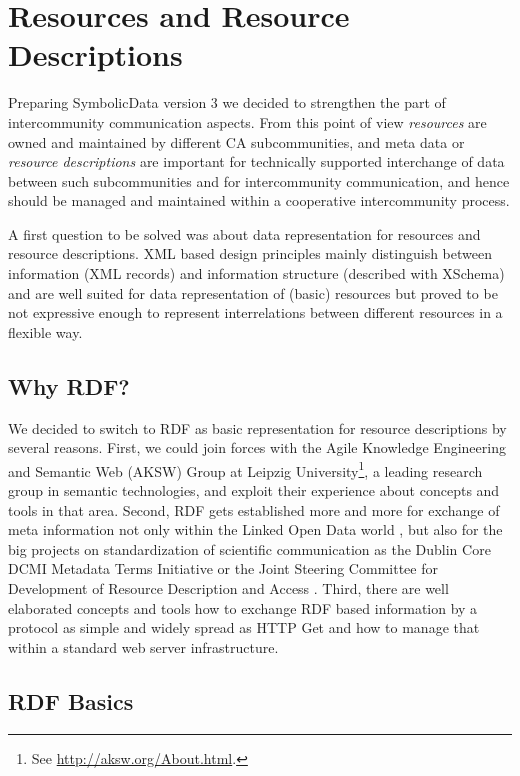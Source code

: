 \documentclass{llncs}
\newcommand{\SD}{{\sc Symbolic\-Data}}
\begin{document}
\section{Resources and Resource Descriptions}

Preparing {\SD} version 3 we decided to strengthen the part of intercommunity
communication aspects.  From this point of view \emph{resources} are owned and
maintained by different CA subcommunities, and meta data or \emph{resource
  descriptions} are important for technically supported interchange of data
between such subcommunities and for intercommunity communication, and hence
should be managed and maintained within a cooperative intercommunity process.

A first question to be solved was about data representation for resources and
resource descriptions.  XML based design principles mainly distinguish between
information (XML records) and information structure (described with XSchema)
and are well suited for data representation of (basic) resources but proved to
be not expressive enough to represent interrelations between different
resources in a flexible way.

\subsection{Why RDF?}

We decided to switch to RDF as basic representation for resource descriptions
by several reasons. First, we could join forces with the Agile Knowledge
Engineering and Semantic Web (AKSW) Group at Leipzig University\footnote{See
  \url{http://aksw.org/About.html}.}, a leading research group in semantic
technologies, and exploit their experience about concepts and tools in that
area. Second, RDF gets established more and more for exchange of meta
information not only within the Linked Open Data world \cite{lod}, but also
for the big projects on standardization of scientific communication as the
Dublin Core DCMI Metadata Terms Initiative \cite{dcterms} or the Joint
Steering Committee for Development of Resource Description and Access
\cite{RDA}.  Third, there are well elaborated concepts and tools how to
exchange RDF based information by a protocol as simple and widely spread as
HTTP Get and how to manage that within a standard web server infrastructure.

\subsection{RDF Basics}
\end{document}
